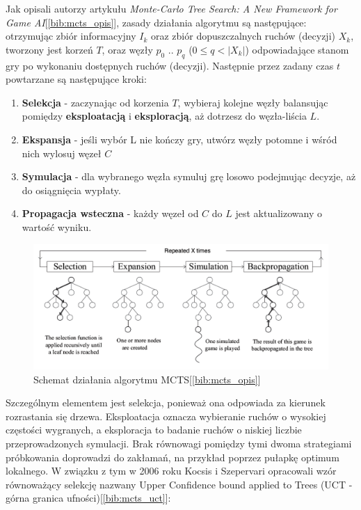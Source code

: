 Jak opisali autorzy artykułu \textit{Monte-Carlo Tree Search: A New Framework for Game AI}[\ref{bib:mcts_opis}], zasady działania algorytmu są następujące: otrzymując zbiór informacyjny $I_k$ oraz zbiór dopuszczalnych ruchów (decyzji) $X_k$, tworzony jest korzeń $T$, oraz węzły $p_0$ .. $p_q$ ($0 \leq q<|X_k|$) odpowiadające stanom gry po wykonaniu dostępnych ruchów (decyzji). Następnie przez zadany czas $t$ powtarzane są następujące kroki:
\begin{enumerate}
	\item \textbf{Selekcja} - zaczynając od korzenia $T$, wybieraj kolejne węzły balansując pomiędzy \textbf{eksploatacją} i \textbf{eksploracją}, aż dotrzesz do węzła-liścia $L$.
	\item \textbf{Ekspansja} - jeśli wybór L nie kończy gry, utwórz węzły potomne i wśród nich wylosuj węzeł $C$
	\item \textbf{Symulacja} - dla wybranego węzła symuluj grę losowo podejmując decyzje, aż do osiągnięcia wypłaty.
	\item \textbf{Propagacja wsteczna} - każdy węzeł od $C$ do $L$ jest aktualizowany o wartość wyniku.
\end{enumerate}
\begin{figure}[h]
	\centering
	\includegraphics[width=\textwidth]{Resources/mcts.png}
	\caption{Schemat działania algorytmu MCTS[\ref{bib:mcts_opis}]} 
	\label{fig:llMainImage}
\end{figure}
Szczególnym elementem jest selekcja, ponieważ ona odpowiada za kierunek rozrastania się drzewa. Eksploatacja oznacza wybieranie ruchów o wysokiej częstości wygranych, a eksploracja to badanie ruchów o niskiej liczbie przeprowadzonych symulacji. Brak równowagi pomiędzy tymi dwoma strategiami próbkowania doprowadzi do zakłamań, na przykład poprzez pułapkę optimum lokalnego. W związku z tym w 2006 roku Kocsis i Szepervari opracowali wzór równoważący selekcję nazwany Upper Confidence bound applied to Trees (UCT - górna granica ufności)[\ref{bib:mcts_uct}]:
